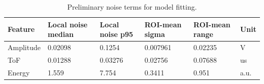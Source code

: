 \begin{table}[htbp]
\centering
\caption{Preliminary noise terms for model fitting.}
\label{tab:cscan_model_noise_terms}
\begin{tabular}{llllll}
\hline
Feature & Local noise median & Local noise p95 & ROI-mean sigma & ROI-mean range & Unit \\
\hline
Amplitude & 0.02098 & 0.1254 & 0.007961 & 0.02235 & V \\
ToF & 0.01288 & 0.03276 & 0.02756 & 0.07688 & us \\
Energy & 1.559 & 7.754 & 0.3411 & 0.951 & a.u. \\
\hline
\end{tabular}
\end{table}
